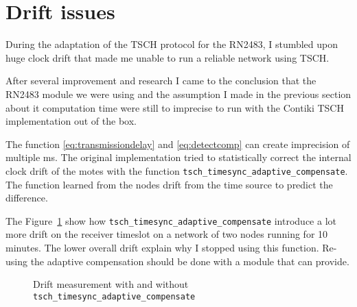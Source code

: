 \section{Drift issues}

During the adaptation of the TSCH protocol for the RN2483, I stumbled upon huge
clock drift that made me unable to run a reliable network using TSCH.

After several improvement and research I came to the conclusion that the RN2483
module we were using and the assumption I made in the previous section about it
computation time were still to imprecise to run with the Contiki TSCH
implementation out of the box.

The function \ref{eq:transmissiondelay} and \ref{eq:detectcomp} can
create imprecision of multiple ms.
The original implementation tried to statistically correct the internal clock
drift of the motes with the function
\lstinline{tsch_timesync_adaptive_compensate}.
The function learned from the nodes drift from the time source to predict the
difference.

The Figure~\ref{fig:driftmeasurement} show how
\lstinline{tsch_timesync_adaptive_compensate} introduce a lot more drift on the
receiver timeslot on a network of two nodes running for 10 minutes.
The lower overall drift explain why I stopped using this function.
Re-using the adaptive compensation should be done with a module that can
provide.

\begin{figure}[H]
  \centering
  \caption{Drift measurement with and without \lstinline{tsch_timesync_adaptive_compensate}\label{fig:driftmeasurement}}
\end{figure}

